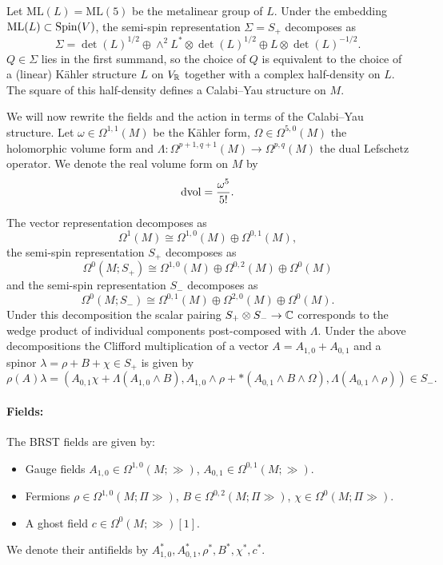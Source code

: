 \documentclass[10pt, oneside]{article}
\newcommand{\ML}{\mathrm{ML}}
\begin{document}
Let $\ML(L) = \ML(5)$ be the metalinear group of $L$. Under the embedding $\ML(L)\subset \Spin(V)$, the semi-spin representation $\Sigma=S_+$ decomposes as
\[\Sigma = \det(L)^{1/2} \oplus \wedge^2 L^*\otimes \det(L)^{1/2}\oplus L\otimes \det(L)^{-1/2}.\]
$Q\in\Sigma$ lies in the first summand, so the choice of $Q$ is equivalent to the choice of a (linear) K\"ahler structure $L$ on $V_\mathbb R$ together with a complex half-density on $L$. The square of this half-density defines a Calabi--Yau structure on $M$.

We will now rewrite the fields and the action in terms of the Calabi--Yau structure. Let $\omega\in\Omega^{1, 1}(M)$ be the K\"ahler form, $\Omega\in\Omega^{5, 0}(M)$ the holomorphic volume form and $\Lambda\colon \Omega^{p+1, q+1}(M)\rightarrow \Omega^{p, q}(M)$ the dual Lefschetz operator. We denote the real volume form on $M$ by
\[\operatorname{dvol} = \frac{\omega^5}{5!}.\]

The vector representation decomposes as
\[\Omega^1(M)\cong \Omega^{1, 0}(M)\oplus \Omega^{0, 1}(M),\]
the semi-spin representation $S_+$ decomposes as
\[\Omega^0(M; S_+)\cong \Omega^{1, 0}(M)\oplus \Omega^{0, 2}(M)\oplus \Omega^0(M)\]
and the semi-spin representation $S_-$ decomposes as
\[\Omega^0(M; S_-)\cong \Omega^{0, 1}(M)\oplus \Omega^{2, 0}(M)\oplus \Omega^0(M).\]
Under this decomposition the scalar pairing $S_+\otimes S_-\rightarrow \mathbb C$ corresponds to the wedge product of individual components post-composed with $\Lambda$. Under the above decompositions the Clifford multiplication of a vector $A = A_{1, 0} + A_{0, 1}$ and a spinor $\lambda = \rho + B + \chi\in S_+$ is given by
\[\rho(A)\lambda = (A_{0, 1}\chi + \Lambda(A_{1, 0}\wedge B), A_{1, 0}\wedge \rho + \ast(A_{0, 1}\wedge B\wedge\Omega), \Lambda(A_{0, 1}\wedge \rho))\in S_-.\]

\vspace{-10pt}
\paragraph{Fields:} The BRST fields are given by:
\begin{itemize}
\item Gauge fields $A_{1, 0}\in\Omega^{1, 0}(M; \gg)$, $A_{0, 1}\in\Omega^{0, 1}(M; \gg)$.
\item Fermions $\rho\in\Omega^{1, 0}(M; \Pi\gg)$, $B\in\Omega^{0, 2}(M; \Pi\gg)$, $\chi\in\Omega^0(M; \Pi\gg)$.
\item A ghost field $c\in\Omega^0(M; \gg)[1]$.
\end{itemize}
We denote their antifields by $A_{1, 0}^*, A_{0, 1}^*, \rho^*, B^*, \chi^*, c^*$.
\end{document}
